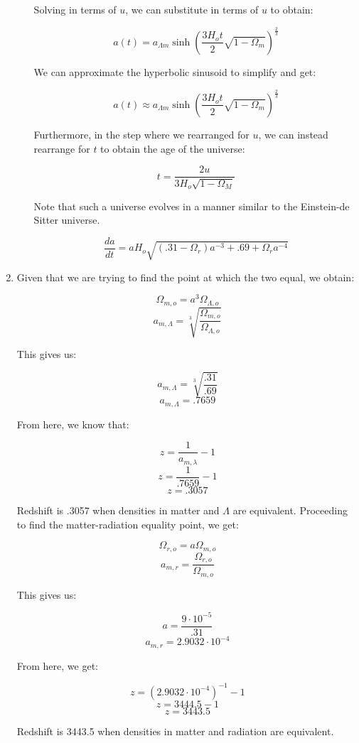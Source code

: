 \begin{enumerate}
\begin{enumerate}
        Solving in terms of $u$, we can substitute in terms of $u$ to obtain:

        $$a(t)=a_{\Lambda m}\sinh\left( \frac{3H_ot}{2}\sqrt{1-\Omega_m} \right)^{\frac{2}{3}}$$

        We can approximate the hyperbolic sinusoid to simplify and get:

        $$\boxed{a(t)\approx a_{\Lambda m}\sinh\left( \frac{3H_ot}{2}\sqrt{1-\Omega_m} \right)^{\frac{2}{3}}}$$

        Furthermore, in the step where we rearranged for $u$, we can instead rearrange for $t$ to obtain the age of the universe:

        $$t=\frac{2u}{3H_o\sqrt{1-\Omega_M}}$$

        Note that such a universe evolves in a manner similar to the Einstein-de Sitter universe.

        $$\frac{da}{dt}=aH_o\sqrt{(.31-\Omega_r)a^{-3}+.69+\Omega_ra^{-4}}$$

    \end{enumerate}

  \item Given that we are trying to find the point at which the two equal, we obtain:

    $$\Omega_{m,o}=a^3\Omega_{\Lambda,o}$$
    $$a_{m,\Lambda}=\sqrt[3]{\frac{\Omega_{m,o}}{\Omega_{\Lambda,o}}}$$

    This gives us:

    $$a_{m,\Lambda}=\sqrt[3]{\frac{.31}{.69}}$$
    $$\boxed{a_{m,\Lambda}=.7659}$$

    From here, we know that:

    $$z=\frac{1}{a_{m,\lambda}}-1$$
    $$z=\frac{1}{.7659}-1$$
    $$\boxed{z=.3057}$$

    Redshift is .3057 when densities in matter and $\Lambda$ are equivalent.  Proceeding to find the matter-radiation equality point, we get:

    $$\Omega_{r,o}=a\Omega_{m,o}$$
    $$a_{m,r}=\frac{\Omega_{r,o}}{\Omega_{m,o}}$$

    This gives us:

    $$a=\frac{9\cdot10^{-5}}{.31}$$
    $$\boxed{a_{m,r}=2.9032\cdot10^{-4}}$$

    From here, we get:

    $$z=(2.9032\cdot10^{-4})^{-1}-1$$
    $$z=3444.5-1$$
    $$\boxed{z=3443.5}$$

    Redshift is 3443.5 when densities in matter and radiation are equivalent.


\end{enumerate}
